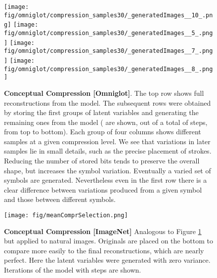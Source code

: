 \documentclass{article}
\begin{document}
\begin{figure}[h] \vspace{-.0cm}
\begin{center}
\begin{minipage}{0.47\textwidth}
\texttt{[image: fig/omniglot/compression\_samples30/\_generatedImages\_\_10\_.png]}
\texttt{[image: fig/omniglot/compression\_samples30/\_generatedImages\_\_5\_.png]}
\texttt{[image: fig/omniglot/compression\_samples30/\_generatedImages\_\_7\_.png]}
\texttt{[image: fig/omniglot/compression\_samples30/\_generatedImages\_\_8\_.png]}
\end{minipage}
\end{center}
\caption{\textbf{Conceptual Compression [Omniglot]}.
The top row shows full reconstructions from the model. The subsequent rows were obtained by storing the first  groups of latent variables and generating the remaining ones from the model ( are shown, out of a total of  steps, from top to bottom). Each group of four columns shows different samples at a given compression level. We see that variations in later samples lie in small details, such as the precise placement of strokes. Reducing the number of stored bits tends to preserve the overall shape, but increases the symbol variation. Eventually a varied set of symbols are generated. Nevertheless even in the first row there is a clear difference between variations produced from a given symbol and those between different symbols. 
}
\label{fig:informationContentOmniglot}
\vspace{-.0cm}
\end{figure}

\begin{figure}[h] \vspace{-.0cm}
\begin{center}
\begin{minipage}{0.5\textwidth}
\texttt{[image: fig/meanComprSelection.png]}
\end{minipage}
\end{center}
\caption{\textbf{Conceptual Compression [ImageNet]} 
Analogous to Figure \ref{fig:informationContentOmniglot} but applied to natural images. Originals are placed on the bottom to compare more easily to the final reconstructions, which are nearly perfect. Here the latent variables were generated with zero variance. Iterations  of the model with  steps are shown.
}
\label{fig:informationContent}
\vspace{-.0cm}
\end{figure}
\end{document}
